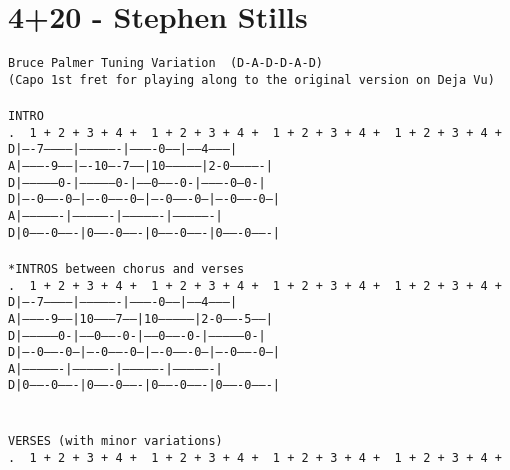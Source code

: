 \newpage
\section{4+20 - Stephen Stills}
\label{4+20 - Stephen Stills}
\texttt{Bruce Palmer Tuning Variation \ (D-A-D-D-A-D)\\
(Capo\ 1st\ fret\ for\ playing\ along\ to\ the\ original\ version\ on\ \;Deja\ Vu\;)\\
\\
INTRO\\
.\ \ 1\ +\ 2\ +\ 3\ +\ 4\ +\ \ 1\ +\ 2\ +\ 3\ +\ 4\ +\ \ 1\ +\ 2\ +\ 3\ +\ 4\ +\ \ 1\ +\ 2\ +\ 3\ +\ 4\ +\\
D|----7-----------|----------------|----------0-----|------4---------|\\
A|----------9-----|----10----7-----|10--------------|2-0-------------|\\
D|--------------0-|--------------0-|------0-------0-|----------0---0-|\\
D|----0-------0---|----0-------0---|----0-------0---|----0-------0---|\\
A|----------------|----------------|----------------|----------------|\\
D|0-------0-------|0-------0-------|0-------0-------|0-------0-------|\\
\\
*INTROS\ between\ chorus\ and\ verses\\
.\ \ 1\ +\ 2\ +\ 3\ +\ 4\ +\ \ 1\ +\ 2\ +\ 3\ +\ 4\ +\ \ 1\ +\ 2\ +\ 3\ +\ 4\ +\ \ 1\ +\ 2\ +\ 3\ +\ 4\ +\\
D|----7-----------|----------------|----------0-----|------4---------|\\
A|----------9-----|10--------7-----|10--------------|2-0-------5-----|\\
D|--------------0-|------0-------0-|------0-------0-|--------------0-|\\
D|----0-------0---|----0-------0---|----0-------0---|----0-------0---|\\
A|----------------|----------------|----------------|----------------|\\
D|0-------0-------|0-------0-------|0-------0-------|0-------0-------|\\
\\
\\
VERSES\ (with\ minor\ variations)\\
.\ \ 1\ +\ 2\ +\ 3\ +\ 4\ +\ \ 1\ +\ 2\ +\ 3\ +\ 4\ +\ \ 1\ +\ 2\ +\ 3\ +\ 4\ +\ \ 1\ +\ 2\ +\ 3\ +\ 4\ +\\
}
